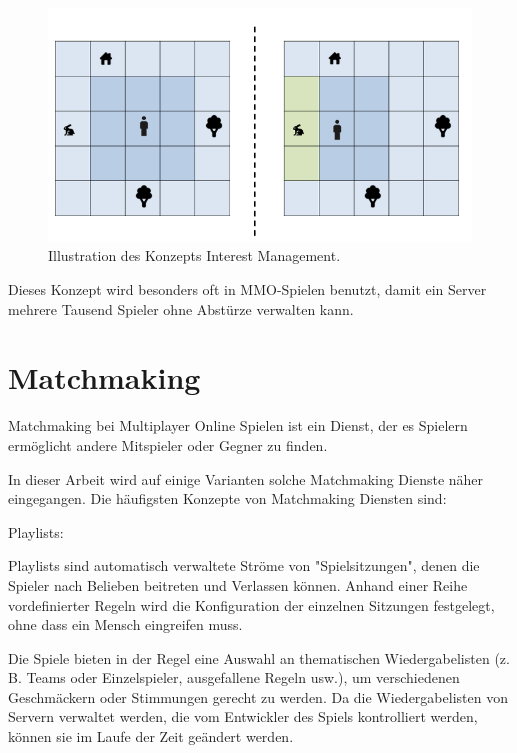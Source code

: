 \begin{figure}
	\centering
	\includegraphics[width=150mm]{images/interest_management.png}
	\caption[Interest Management]{Illustration des Konzepts Interest Management. \cite{JeromeRenaux.2017} }
	\label{pic:interest_management}
\end{figure}

Dieses Konzept wird besonders oft in MMO-Spielen \cite{Wikipedia.2021i} benutzt, damit ein Server mehrere Tausend Spieler ohne Abstürze verwalten kann. 

\cite{Smed.2002c}


\section{Matchmaking}

Matchmaking bei Multiplayer Online Spielen ist ein Dienst, der es Spielern ermöglicht andere Mitspieler oder Gegner zu finden. \cite{.2014}

In dieser Arbeit wird auf einige Varianten solche Matchmaking Dienste näher eingegangen. Die häufigsten Konzepte von Matchmaking Diensten sind:

Playlists:

Playlists sind automatisch verwaltete Ströme von "Spielsitzungen", denen die Spieler nach Belieben beitreten und Verlassen können. Anhand einer Reihe vordefinierter Regeln wird die Konfiguration der einzelnen Sitzungen festgelegt, ohne dass ein Mensch eingreifen muss.  

Die Spiele bieten in der Regel eine Auswahl an thematischen Wiedergabelisten (z. B. Teams oder Einzelspieler, ausgefallene Regeln usw.), um verschiedenen Geschmäckern oder Stimmungen gerecht zu werden. Da die Wiedergabelisten von Servern verwaltet werden, die vom Entwickler des Spiels kontrolliert werden, können sie im Laufe der Zeit geändert werden.


